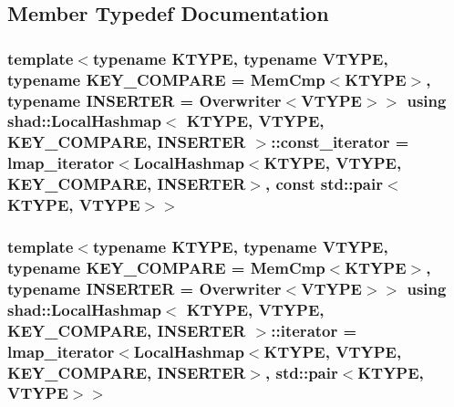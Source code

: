 \subsection{Member Typedef Documentation}
\hypertarget{classshad_1_1LocalHashmap_ad5e054bdbc20f161cd8df8e00c525401}{
\subsubsection[{const\-\_\-iterator}]{\setlength{\rightskip}{0pt plus 5cm}template$<$typename K\-T\-Y\-P\-E, typename V\-T\-Y\-P\-E, typename K\-E\-Y\-\_\-\-C\-O\-M\-P\-A\-R\-E = Mem\-Cmp$<$\-K\-T\-Y\-P\-E$>$, typename I\-N\-S\-E\-R\-T\-E\-R = Overwriter$<$\-V\-T\-Y\-P\-E$>$$>$ using {\bf shad\-::\-Local\-Hashmap}$<$ K\-T\-Y\-P\-E, V\-T\-Y\-P\-E, K\-E\-Y\-\_\-\-C\-O\-M\-P\-A\-R\-E, I\-N\-S\-E\-R\-T\-E\-R $>$\-::{\bf const\-\_\-iterator} =  {\bf lmap\-\_\-iterator}$<${\bf Local\-Hashmap}$<$K\-T\-Y\-P\-E, V\-T\-Y\-P\-E, K\-E\-Y\-\_\-\-C\-O\-M\-P\-A\-R\-E, I\-N\-S\-E\-R\-T\-E\-R$>$, const std\-::pair$<$K\-T\-Y\-P\-E, V\-T\-Y\-P\-E$>$$>$}}\label{classshad_1_1LocalHashmap_ad5e054bdbc20f161cd8df8e00c525401}
\hypertarget{classshad_1_1LocalHashmap_a130dbe16edd42ee7aa2e27eac6ee3cf4}{
\subsubsection[{iterator}]{\setlength{\rightskip}{0pt plus 5cm}template$<$typename K\-T\-Y\-P\-E, typename V\-T\-Y\-P\-E, typename K\-E\-Y\-\_\-\-C\-O\-M\-P\-A\-R\-E = Mem\-Cmp$<$\-K\-T\-Y\-P\-E$>$, typename I\-N\-S\-E\-R\-T\-E\-R = Overwriter$<$\-V\-T\-Y\-P\-E$>$$>$ using {\bf shad\-::\-Local\-Hashmap}$<$ K\-T\-Y\-P\-E, V\-T\-Y\-P\-E, K\-E\-Y\-\_\-\-C\-O\-M\-P\-A\-R\-E, I\-N\-S\-E\-R\-T\-E\-R $>$\-::{\bf iterator} =  {\bf lmap\-\_\-iterator}$<${\bf Local\-Hashmap}$<$K\-T\-Y\-P\-E, V\-T\-Y\-P\-E, K\-E\-Y\-\_\-\-C\-O\-M\-P\-A\-R\-E, I\-N\-S\-E\-R\-T\-E\-R$>$, std\-::pair$<$K\-T\-Y\-P\-E, V\-T\-Y\-P\-E$>$$>$}}\label{classshad_1_1LocalHashmap_a130dbe16edd42ee7aa2e27eac6ee3cf4}
